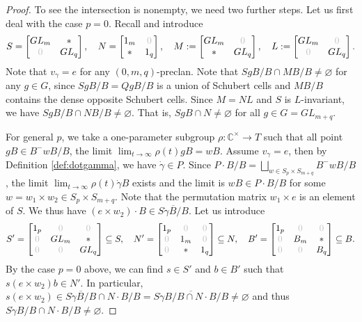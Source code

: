\documentclass[12pt,reqno]{amsart}
\numberwithin{equation}{section}
\theoremstyle{definition}
\begin{document}
\begin{proof}
To see the intersection is nonempty, we need two further steps. 
Let us first deal with the case $p=0$. 
Recall and introduce 
$$\def\O{\color{lightgray}0}
S=\left[\begin{matrix}
GL_m & * \\ \O & GL_q
\end{matrix}\right],\quad 
N=\left[\begin{matrix}
1_m & \O \\ * & 1_q
\end{matrix}\right],\quad 
M:=\left[\begin{matrix}
GL_m & \O \\ * & GL_q
\end{matrix}\right],\quad 
L:=\left[\begin{matrix}
GL_m & \O \\ \O & GL_q
\end{matrix}\right].$$
Note that $v_{\gamma}=e$ for any $(0,m,q)$-preclan. 
Note that 
$SgB/B\cap MB/B\neq \varnothing$ for any $g\in G$, since $SgB/B=QgB/B$ is a union of Schubert cells and $MB/B$ contains the dense opposite Schubert cells. 
Since $M=NL$ and $S$ is $L$-invariant, we have 
$SgB/B\cap NB/B\neq \varnothing$. 
That is, $SgB\cap N\neq \varnothing$ for all $g\in G=GL_{m+q}$. 

For general $p$, we take a one-parameter subgroup $\rho:\mathbb{C}^\times \to T$ such that all point $g B\in B^-wB/B$, the limit
$\lim_{t\to \infty}\rho(t)gB=wB$. 
Assume $v_\gamma=e$, then by  Definition \ref{def:dotgamma}, we have $\dot{\gamma}\in P$. 
Since $P\cdot B/B=\bigsqcup_{w\in S_p\times S_{m+q}}B^-wB/B$, the limit
$\lim_{t\to\infty}\rho(t)\dot{\gamma}B$ exists and the limit is $wB\in P\cdot B/B$ for some $w=w_1\times w_2\in S_p\times S_{m+q}$. 
Note that the permutation matrix $w_1\times e$ is an element of $S$. We thus have $(e\times w_2)\cdot B\in \overline{S\dot{\gamma}B/B}$.
Let us introduce 
$$\def\O{\color{lightgray}0}
S'=\left[\begin{matrix}
1_p &\O &\O\\
\O & GL_m & * \\ \O & \O & GL_q
\end{matrix}\right]\subseteq S,\quad 
N'=\left[\begin{matrix}
1_p& \O& \O\\
\O & 1_m & \O \\\O & * & 1_q
\end{matrix}\right]\subseteq N ,\quad 
B'=
\left[\begin{matrix}
1_p&\O & \O\\
\O & B_m & * \\\O & \O & B_q
\end{matrix}\right]\subseteq B.
$$
By the case $p=0$ above, we can find $s\in S'$ and $b\in B'$ such that $s(e\times w_2)b\in N'$. 
In particular, 
$s(e\times w_2)\in 
\overline{S\dot{\gamma}B/B}\cap N\cdot B/B = \overline{S\dot{\gamma}B/B\cap N\cdot B/B}\neq \varnothing$ and thus $S\dot{\gamma}B/B\cap N\cdot B/B\neq \varnothing$. 
\end{proof}
\end{document}
